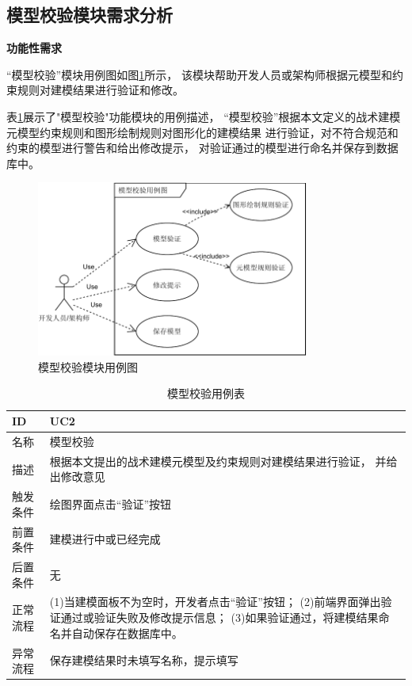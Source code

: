 \subsection{模型校验模块需求分析}

\textbf{功能性需求}

“模型校验”模块用例图如图\ref{us2}所示，
该模块帮助开发人员或架构师根据元模型和约束规则对建模结果进行验证和修改。

表\ref{usecase2}展示了"模型校验"功能模块的用例描述，
“模型校验”根据本文定义的战术建模元模型约束规则和图形绘制规则对图形化的建模结果
进行验证，对不符合规范和约束的模型进行警告和给出修改提示，
对验证通过的模型进行命名并保存到数据库中。

\begin{figure}[!htbp] %
    \centering %
    \includegraphics[width=0.8\textwidth]{FIGs/chapter4/us2.pdf} %
    \caption{模型校验模块用例图} %
    \label{us2} %
\end{figure}%


{\footnotesize
\begin{longtable}[h]{m{80pt}|m{305pt}}
    \caption[模型校验用例表]{模型校验用例表} \label{usecase2} \\
        \hline  
        ID&UC2\\
        \hline
        名称&模型校验\\
        \hline
        描述&根据本文提出的战术建模元模型及约束规则对建模结果进行验证，
        并给出修改意见\\
        \hline
        触发条件&绘图界面点击“验证”按钮\\
        \hline
        前置条件&建模进行中或已经完成\\
        \hline
        后置条件&无\\
        \hline
        正常流程& (1)当建模面板不为空时，开发者点击“验证”按钮；
        \newline (2)前端界面弹出验证通过或验证失败及修改提示信息；
        \newline (3)如果验证通过，将建模结果命名并自动保存在数据库中。\\
        \hline
        异常流程&保存建模结果时未填写名称，提示填写\\
        \hline
    \end{longtable} 
}

